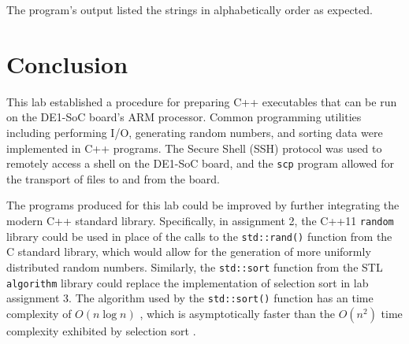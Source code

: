 \documentclass[11pt, letterpaper]{article} %
\begin{document}
The program's output listed the strings in alphabetically order as expected.

\section*{Conclusion}

This lab established a procedure for preparing C++ executables that can be run on the DE1-SoC board's ARM processor. Common programming utilities including performing I/O, generating random numbers, and sorting data were implemented in C++ programs. The Secure Shell (SSH) protocol was used to remotely access a shell on the DE1-SoC board, and the \texttt{scp} program allowed for the transport of files to and from the board.

The programs produced for this lab could be improved by further integrating the modern C++ standard library.  Specifically, in assignment 2, the C++11 \texttt{random} library could be used in place of the calls to the \texttt{std::rand()} function from the C standard library, which would allow for the generation of more uniformly distributed random numbers. Similarly, the \texttt{std::sort} function from the STL \texttt{algorithm} library could replace the implementation of selection sort in lab assignment 3. The algorithm used by the \texttt{std::sort()} function has an time complexity of $O(n\log n)$ \cite{cppreference-algorithm-sort}, which is asymptotically faster than the $O(n^2)$ time complexity exhibited by selection sort \cite{wiki:selection-sort}.


\clearpage



\end{document}
